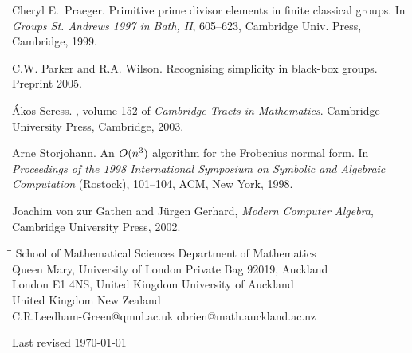 \documentclass[12pt]{article}
\begin{document}
\begin{thebibliography}{10}
Cheryl E.\ Praeger.
 Primitive prime divisor elements in finite classical groups.
In {\it Groups St. Andrews 1997 in Bath, II}, 605--623,
Cambridge Univ. Press, Cambridge, 1999.

C.W. Parker and R.A. Wilson.
Recognising simplicity in black-box groups. 
Preprint 2005.

{\'A}kos Seress.
, volume 152 of {\em Cambridge
  Tracts in Mathematics}.
\newblock Cambridge University Press, Cambridge, 2003.

Arne Storjohann.
An $O(n\sp 3)$ algorithm for the Frobenius normal form. In
{\em Proceedings of the 1998 International Symposium on Symbolic
and Algebraic Computation} (Rostock), 101--104, ACM, New York, 1998.

Joachim von zur Gathen and J\"urgen Gerhard,
{\it Modern Computer Algebra}, Cambridge University Press, 2002.
\end{thebibliography}

\begin{tabbing}
\=\hspace{70mm}\=\kill
\>School of Mathematical Sciences \>Department of Mathematics    \\
\>Queen Mary, University of London \>Private Bag 92019, Auckland \\
\>London E1 4NS, United Kingdom   \>University of Auckland     \\
\>United Kingdom                  \> New Zealand     \\
\> C.R.Leedham-Green@qmul.ac.uk   \> obrien@math.auckland.ac.nz
\end{tabbing}

\vspace*{2mm}
\noindent 
Last revised \today
\end{document}
